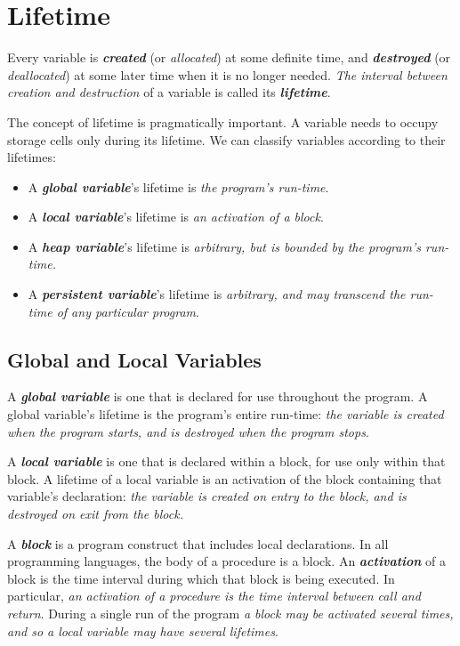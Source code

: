 \section{Lifetime}

Every variable is \textit{\textbf{created}} (or \textit{allocated}) at some definite time, and \textit{\textbf{destroyed}} (or \textit{deallocated}) at some later time when it is no longer needed. \textit{The interval between creation and destruction} of a variable is called its \textit{\textbf{lifetime}}.

The concept of lifetime is pragmatically important. A variable needs to occupy storage cells only during its lifetime. We can classify variables according to their lifetimes:
\begin{itemize}
  \item A \textit{\textbf{global variable}}'s lifetime is \textit{the program's run-time}.
  \item A \textit{\textbf{local variable}}'s lifetime is \textit{an activation of a block}.
  \item A \textit{\textbf{heap variable}}'s lifetime is \textit{arbitrary, but is bounded by the program's run-time.}
  \item A \textit{\textbf{persistent variable}}'s lifetime is \textit{arbitrary, and may transcend the run-time of any particular program}.
\end{itemize}

\subsection{Global and Local Variables}

A \textit{\textbf{global variable}} is one that is declared for use throughout the program. A global variable's lifetime is the program's entire run-time: \textit{the variable is created when the program starts, and is destroyed when the program stops}.

A \textit{\textbf{local variable}} is one that is declared within a block, for use only within that block. A lifetime of a local variable is an activation of the block containing that variable's declaration: \textit{the variable is created on entry to the block, and is destroyed on exit from the block.}

A \textit{\textbf{block}} is a program construct that includes local declarations. In all programming languages, the body of a procedure is a block. An \textit{\textbf{activation}} of a block is the time interval during which that block is being executed. In particular, \textit{an activation of a procedure is the time interval between call and return}. During a single run of the program \textit{a block may be activated several times, and so a local variable may have several lifetimes}.

